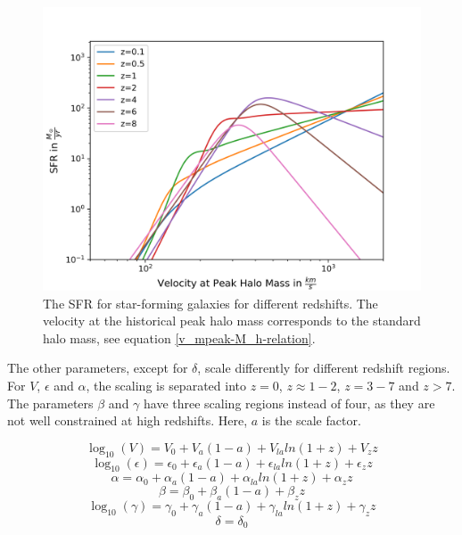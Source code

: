 \begin{figure}
    \centering
    \includegraphics[width=1\linewidth]{Images/sfr_of_v.png}
    \caption[The SFR for star-forming galaxies for different redshifts.]{The SFR for star-forming galaxies for different redshifts. The velocity at the historical peak halo mass corresponds to the standard halo mass, see equation \ref{v_mpeak-M_h-relation}.}
    \label{SFR_of_v}
\end{figure} 

The other parameters, except for $\delta$, scale differently for different redshift regions. For $V$, $\epsilon$ and $\alpha$, the scaling is separated into $z=0$, $z\approx 1-2$, $z=3-7$ and $z>7$. The parameters $\beta$ and $\gamma$ have three scaling regions instead of four, as they are not well constrained at high redshifts. Here, $a$ is the scale factor.

\begin{equation}
    \log_{10}(V) = V_0 + V_a(1-a)+V_{la}ln(1+z)+V_z z
\end{equation}
\begin{equation}
    \log_{10}(\epsilon) = \epsilon_0 + \epsilon_a(1-a)+\epsilon_{la}ln(1+z)+\epsilon_z z
\end{equation}
\begin{equation}
    \alpha = \alpha_0 + \alpha_a(1-a)+\alpha_{la}ln(1+z)+\alpha_z z
\end{equation}
\begin{equation}
    \beta = \beta_0 + \beta_a(1-a)+\beta_z z
\end{equation}
\begin{equation}
    \log_{10}(\gamma) = \gamma_0 + \gamma_a(1-a)+\gamma_{la}ln(1+z)+\gamma_z z
\end{equation}
\begin{equation}
    \delta = \delta_0
\end{equation}

